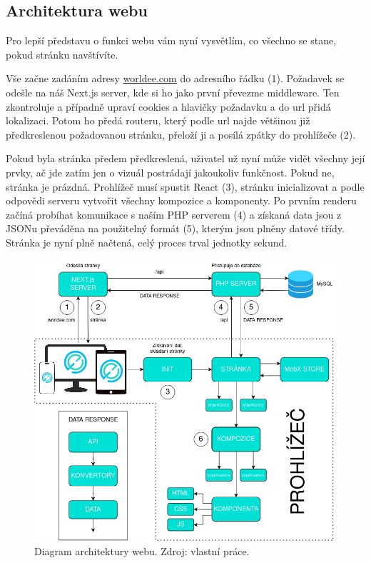 \subsection{Architektura webu}
Pro lepší představu o funkci webu vám nyní vysvětlím, co všechno se stane, pokud stránku navštívíte.

Vše začne zadáním adresy \href{https://www.worldee.com}{worldee.com} do adresního řádku (1). Požadavek se odešle na náš Next.js server, kde si ho jako první převezme middleware. Ten zkontroluje a případně upraví cookies a hlavičky požadavku a do url přidá lokalizaci. Potom ho předá routeru, který podle url najde většinou již předkreslenou požadovanou stránku, přeloží ji a posílá zpátky do prohlížeče (2).

Pokud byla stránka předem předkreslená, uživatel už nyní může vidět všechny její prvky, ač jde zatím jen o vizuál postrádají jakoukoliv funkčnost. Pokud ne, stránka je prázdná. Prohlížeč musí spustit React (3), stránku inicializovat a podle odpovědi serveru vytvořit všechny kompozice a komponenty. Po prvním renderu začíná probíhat komunikace s naším PHP serverem (4) a získaná data jsou z JSONu převáděna na použitelný formát (5), kterým jsou plněny datové třídy. Stránka je nyní plně načtená, celý proces trval jednotky sekund. 

\begin{figure}[!h]
    \centering
    \includegraphics[width=1\linewidth]{obrazky/architektura.png}
    \caption{Diagram architektury webu. Zdroj: vlastní práce.}
\end{figure}
\clearpage

